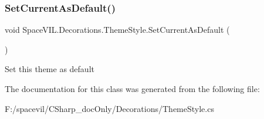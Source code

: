 \subsubsection{\texorpdfstring{Set\+Current\+As\+Default()}{SetCurrentAsDefault()}}
{\footnotesize\ttfamily void Space\+V\+I\+L.\+Decorations.\+Theme\+Style.\+Set\+Current\+As\+Default (\begin{DoxyParamCaption}{ }\end{DoxyParamCaption})}



Set this theme as default 



The documentation for this class was generated from the following file\+:\begin{DoxyCompactItemize}
\item 
F\+:/spacevil/\+C\+Sharp\+\_\+doc\+Only/\+Decorations/Theme\+Style.\+cs\end{DoxyCompactItemize}

